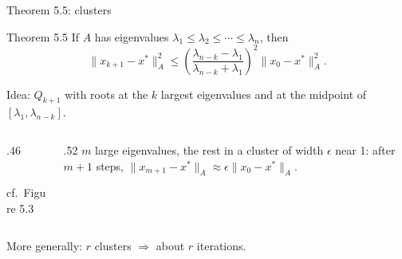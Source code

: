 \documentclass[12pt,aspectratio=169]{beamer}
\begin{document}
\begin{frame}{Theorem 5.5: clusters}
  \begin{block}{Theorem 5.5}
    If $A$ has eigenvalues $\lambda_1\le\lambda_2\le\cdots\le\lambda_n$, then
    \begin{equation}
      \|x_{k+1}-x^*\|_A^2 \le \left(\frac{\lambda_{n-k}-\lambda_1}{\lambda_{n-k}+\lambda_1}\right)^2\|x_0-x^*\|_A^2. \tag{5.35}
    \end{equation}
  \end{block}
  Idea: $Q_{k+1}$ with roots at the $k$ largest eigenvalues and at the midpoint of $[\lambda_1,\lambda_{n-k}]$.
  \vspace{.5ex}

  \begin{columns}[c]
    \begin{column}{.46\textwidth}
      \centering
      \\
      cf.\ Figure 5.3
    \end{column}
    \begin{column}{.52\textwidth}
      $m$ large eigenvalues, the rest in a cluster of width $\epsilon$ near 1:
      after $m+1$ steps, $\|x_{m+1}-x^*\|_A\approx\epsilon\|x_0-x^*\|_A$.
    \end{column}
  \end{columns}
  More generally: $r$ clusters $\Rightarrow$ about $r$ iterations.
\end{frame}
\end{document}
